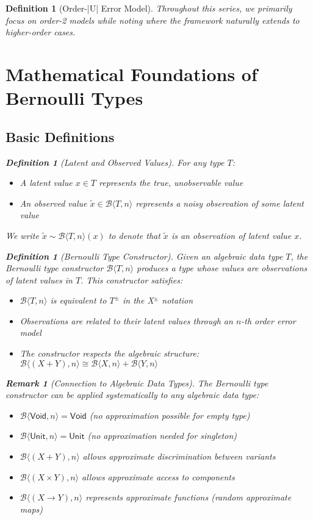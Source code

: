 \documentclass[11pt,final,hidelinks]{article}
\newtheorem{definition}[theorem]{Definition}
\newtheorem{remark}[theorem]{Remark}
\newcommand{\bernoulli}[2]{\mathcal{B}\langle #1, #2 \rangle}
\newcommand{\voidtype}{\mathsf{Void}}
\newcommand{\unittype}{\mathsf{Unit}}
\newcommand{\sumtype}[2]{#1 + #2}
\newcommand{\prodtype}[2]{#1 \times #2}
\newcommand{\exptype}[2]{#1 \to #2}
\begin{document}
\begin{definition}[Order-|U| Error Model]
Throughout this series, we primarily focus on order-2 models while noting where the framework naturally extends to higher-order cases.

\section{Mathematical Foundations of Bernoulli Types}

\subsection{Basic Definitions}

\begin{definition}[Latent and Observed Values]
For any type $T$:
\begin{itemize}
    \item A \emph{latent value} $x \in T$ represents the true, unobservable value
    \item An \emph{observed value} $\tilde{x} \in \bernoulli{T}{n}$ represents a noisy observation of some latent value
\end{itemize}
We write $\tilde{x} \sim \bernoulli{T}{n}(x)$ to denote that $\tilde{x}$ is an observation of latent value $x$.
\end{definition}

\begin{definition}[Bernoulli Type Constructor]
Given an algebraic data type $T$, the Bernoulli type constructor $\bernoulli{T}{n}$ produces a type whose values are observations of latent values in $T$. This constructor satisfies:
\begin{itemize}
    \item $\bernoulli{T}{n}$ is equivalent to $T^{\pm}$ in the X$^{\pm}$ notation
    \item Observations are related to their latent values through an $n$-th order error model
    \item The constructor respects the algebraic structure: $\bernoulli{(\sumtype{X}{Y})}{n} \cong \sumtype{\bernoulli{X}{n}}{\bernoulli{Y}{n}}$
\end{itemize}
\end{definition}

\begin{remark}[Connection to Algebraic Data Types]
The Bernoulli type constructor can be applied systematically to any algebraic data type:
\begin{itemize}
    \item $\bernoulli{\voidtype}{n} = \voidtype$ (no approximation possible for empty type)
    \item $\bernoulli{\unittype}{n} = \unittype$ (no approximation needed for singleton)  
    \item $\bernoulli{(\sumtype{X}{Y})}{n}$ allows approximate discrimination between variants
    \item $\bernoulli{(\prodtype{X}{Y})}{n}$ allows approximate access to components
    \item $\bernoulli{(\exptype{X}{Y})}{n}$ represents approximate functions (random approximate maps)
\end{itemize}
\end{remark}


\end{definition}
\end{document}

